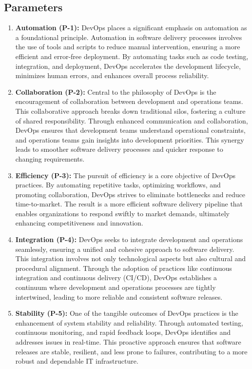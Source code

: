 \documentclass[12pt, letterpaper]{article}
\begin{document}
\subsection{Parameters}
\begin{enumerate}

    \item \textbf{Automation (P-1):} 
    DevOps places a significant emphasis on automation as a foundational principle. Automation in software delivery processes involves the use of tools and scripts to reduce manual intervention, ensuring a more efficient and error-free deployment. By automating tasks such as code testing, integration, and deployment, DevOps accelerates the development lifecycle, minimizes human errors, and enhances overall process reliability.

    \item \textbf{Collaboration (P-2):} 
    Central to the philosophy of DevOps is the encouragement of collaboration between development and operations teams. This collaborative approach breaks down traditional silos, fostering a culture of shared responsibility. Through enhanced communication and collaboration, DevOps ensures that development teams understand operational constraints, and operations teams gain insights into development priorities. This synergy leads to smoother software delivery processes and quicker response to changing requirements.

    \item \textbf{Efficiency (P-3):} 
    The pursuit of efficiency is a core objective of DevOps practices. By automating repetitive tasks, optimizing workflows, and promoting collaboration, DevOps strives to eliminate bottlenecks and reduce time-to-market. The result is a more efficient software delivery pipeline that enables organizations to respond swiftly to market demands, ultimately enhancing competitiveness and innovation.

    \item \textbf{Integration (P-4):} 
    DevOps seeks to integrate development and operations seamlessly, ensuring a unified and cohesive approach to software delivery. This integration involves not only technological aspects but also cultural and procedural alignment. Through the adoption of practices like continuous integration and continuous delivery (CI/CD), DevOps establishes a continuum where development and operations processes are tightly intertwined, leading to more reliable and consistent software releases.

    \item \textbf{Stability (P-5):} 
    One of the tangible outcomes of DevOps practices is the enhancement of system stability and reliability. Through automated testing, continuous monitoring, and rapid feedback loops, DevOps identifies and addresses issues in real-time. This proactive approach ensures that software releases are stable, resilient, and less prone to failures, contributing to a more robust and dependable IT infrastructure.


\end{enumerate}
\end{document}
